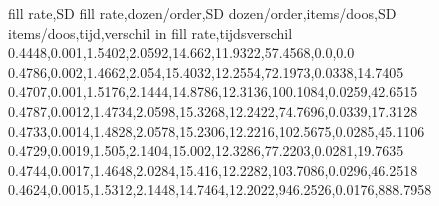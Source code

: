 fill rate,SD fill rate,dozen/order,SD dozen/order,items/doos,SD items/doos,tijd,verschil in fill rate,tijdsverschil
0.4448,0.001,1.5402,2.0592,14.662,11.9322,57.4568,0.0,0.0
0.4786,0.002,1.4662,2.054,15.4032,12.2554,72.1973,0.0338,14.7405
0.4707,0.001,1.5176,2.1444,14.8786,12.3136,100.1084,0.0259,42.6515
0.4787,0.0012,1.4734,2.0598,15.3268,12.2422,74.7696,0.0339,17.3128
0.4733,0.0014,1.4828,2.0578,15.2306,12.2216,102.5675,0.0285,45.1106
0.4729,0.0019,1.505,2.1404,15.002,12.3286,77.2203,0.0281,19.7635
0.4744,0.0017,1.4648,2.0284,15.416,12.2282,103.7086,0.0296,46.2518
0.4624,0.0015,1.5312,2.1448,14.7464,12.2022,946.2526,0.0176,888.7958
